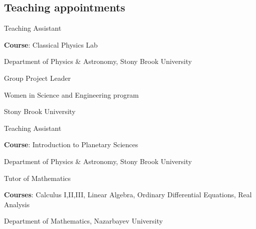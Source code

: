 \documentclass[10pt]{article} %
\begin{document}
\begin{paracol}{1}


	


\section{Teaching appointments} 
	{Teaching Assistant}
	{\textbf{Course}: Classical Physics Lab
	
	Department of Physics \& Astronomy, Stony Brook University}

	{Group Project Leader}
	{ Women in Science and Engineering program
	
	Stony Brook University}
	
	{Teaching Assistant}
	{\textbf{Course}: Introduction to Planetary Sciences
	
	Department of Physics \& Astronomy, Stony Brook University}
	
	
	{Tutor of Mathematics}
	{\textbf{Courses}: Calculus I,II,III, Linear Algebra, Ordinary Differential Equations, Real Analysis
	
	Department of Mathematics, Nazarbayev University}

	


\end{paracol}
\end{document}
